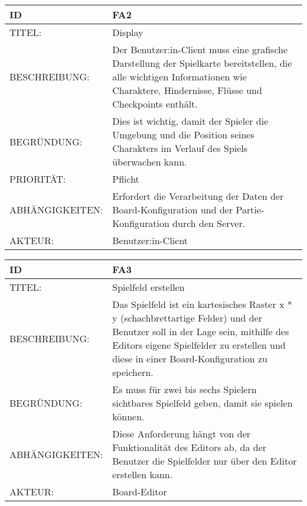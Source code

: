 \documentclass{uulm-assignment}
\begin{document}
    \begin{tabularx}{\textwidth}{|l|X |} \hline
        \textbf{ID} & \textbf{FA2} \\
        \hline
        TITEL: & Display \\
        \hline
        BESCHREIBUNG: & Der Benutzer:in-Client muss eine grafische Darstellung der Spielkarte bereitstellen, die alle wichtigen Informationen wie Charaktere, Hindernisse, Flüsse und Checkpoints enthält. 
        \\
        \hline
        BEGRÜNDUNG: &Dies ist wichtig, damit der Spieler die Umgebung und die Position seines Charakters im Verlauf des Spiels überwachen kann.  \\
        \hline
        PRIORITÄT: & Pflicht \\
        \hline
        ABHÄNGIGKEITEN: &  Erfordert die Verarbeitung der Daten der Board-Konfiguration und der Partie-Konfiguration durch den Server. \\
        \hline 
        AKTEUR: &  Benutzer:in-Client
        \\
        \hline
    \end{tabularx}

    \begin{tabularx}{\textwidth}{|l|X |} \hline
        \textbf{ID} & \textbf{FA3} \\
        \hline
        TITEL: & Spielfeld erstellen \\
        \hline
        BESCHREIBUNG: & Das Spielfeld ist ein kartesisches Raster x * y (schachbrettartige Felder) und der Benutzer soll in der Lage sein, mithilfe des Editors eigene Spielfelder zu erstellen und diese in einer Board-Konfiguration zu speichern.
        \\
        \hline
        BEGRÜNDUNG: & Es muss für zwei bis sechs Spielern sichtbares Spielfeld geben, damit sie spielen können.\\
        \hline
        ABHÄNGIGKEITEN: & Diese Anforderung hängt von der Funktionalität des Editors ab, da der Benutzer die Spielfelder nur über den Editor erstellen kann.\\
        \hline
        AKTEUR: & Board-Editor
        \\
        \hline
    \end{tabularx}
\end{document}
